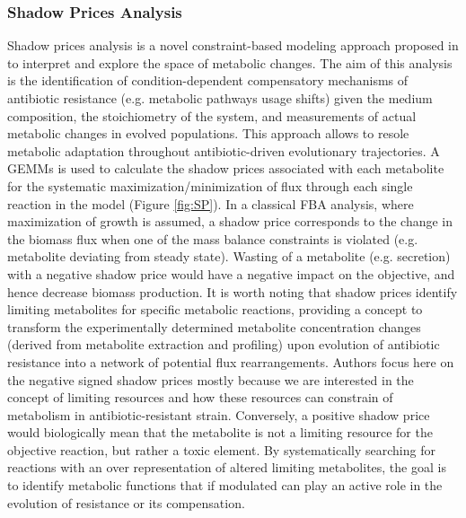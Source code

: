 \documentclass{article}
\begin{document}
\subsubsection{Shadow Prices Analysis}

Shadow prices analysis is a novel constraint-based modeling approach proposed in \cite{Zampieri} to interpret and explore the space of metabolic changes. The aim of this analysis is the identification of condition-dependent compensatory mechanisms of antibiotic resistance (e.g. metabolic pathways usage shifts) given the medium composition, the stoichiometry of the system, and measurements of actual metabolic changes in evolved populations. This approach allows to resole metabolic adaptation throughout antibiotic-driven evolutionary trajectories. A GEMMs is used to calculate the shadow prices associated with each metabolite for the systematic maximization/minimization of flux through each single reaction in the model (Figure \ref{fig:SP}). In a classical FBA analysis, where maximization of growth is assumed, a shadow price corresponds to the change in the biomass flux when one of the mass balance constraints is violated (e.g. metabolite deviating from steady state). Wasting of a metabolite (e.g. secretion) with a negative shadow price would have a negative impact on the objective, and hence decrease biomass production. It is worth noting that shadow prices identify limiting metabolites for specific metabolic reactions, providing a concept to transform the experimentally determined metabolite concentration changes (derived from metabolite extraction and profiling) upon evolution of antibiotic resistance into a network of potential flux rearrangements. Authors focus here on the negative signed shadow prices mostly because we are interested in the concept of limiting resources and how these resources can constrain of metabolism in antibiotic-resistant strain. Conversely, a positive shadow price would biologically mean that the metabolite is not a limiting resource for the objective reaction, but rather a toxic element. By systematically searching for reactions with an over representation of altered limiting metabolites, the goal is to identify metabolic functions that if modulated can play an active role in the evolution of resistance or its compensation.
\end{document}
